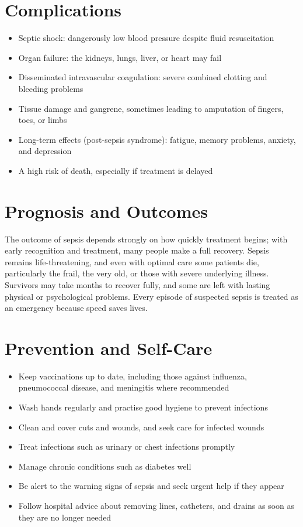 \section*{Complications}
\begin{itemize}
    \item Septic shock: dangerously low blood pressure despite fluid resuscitation
    \item Organ failure: the kidneys, lungs, liver, or heart may fail
    \item Disseminated intravascular coagulation: severe combined clotting and bleeding problems
    \item Tissue damage and gangrene, sometimes leading to amputation of fingers, toes, or limbs
    \item Long-term effects (post-sepsis syndrome): fatigue, memory problems, anxiety, and depression
    \item A high risk of death, especially if treatment is delayed
\end{itemize}

\section*{Prognosis and Outcomes}
The outcome of sepsis depends strongly on how quickly treatment begins; with early recognition and treatment, many people make a full recovery. Sepsis remains life-threatening, and even with optimal care some patients die, particularly the frail, the very old, or those with severe underlying illness. Survivors may take months to recover fully, and some are left with lasting physical or psychological problems. Every episode of suspected sepsis is treated as an emergency because speed saves lives.

\section*{Prevention and Self-Care}
\begin{itemize}
    \item Keep vaccinations up to date, including those against influenza, pneumococcal disease, and meningitis where recommended
    \item Wash hands regularly and practise good hygiene to prevent infections
    \item Clean and cover cuts and wounds, and seek care for infected wounds
    \item Treat infections such as urinary or chest infections promptly
    \item Manage chronic conditions such as diabetes well
    \item Be alert to the warning signs of sepsis and seek urgent help if they appear
    \item Follow hospital advice about removing lines, catheters, and drains as soon as they are no longer needed
\end{itemize}

